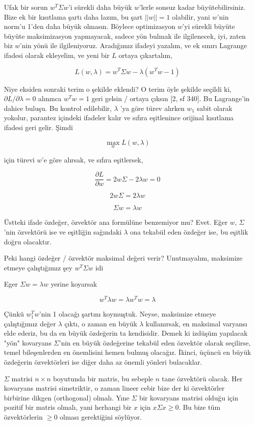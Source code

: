 \documentclass[12pt,fleqn]{article}\usepackage{../../common}
\begin{document}
Ufak bir sorun $w^T\Sigma w$'i sürekli daha büyük $w$'lerle sonsuz
kadar büyütebilirsiniz. Bize ek bir kısıtlama şartı daha lazım, bu şart
$||w|| = 1$ olabilir, yani $w$'nin norm'u 1'den daha büyük olmasın. Böylece
optimizasyon $w$'yi sürekli büyüte büyüte maksimizasyon yapmayacak, sadece
yön bulmak ile ilgilenecek, iyi, zaten biz $w$'nin yönü ile
ilgileniyoruz. Aradığımız ifadeyi yazalım, ve ek sınırı Lagrange ifadesi
olarak ekleyelim, ve yeni bir $L$ ortaya çıkartalım,

$$ L(w,\lambda) =  w^T \Sigma w  - \lambda(w^T w - 1) $$

Niye eksiden sonraki terim o şekilde eklendi? O terim öyle şekilde seçildi
ki, $\partial L / \partial \lambda = 0$ alınınca $w^Tw = 1$ geri gelsin /
ortaya çıksın [2, sf 340]. Bu Lagrange'in dahice buluşu. Bu kontrol
edilebilir, $\lambda$ 'ya göre türev alırken $w_1$ sabit olarak yokolur,
parantez içindeki ifadeler kalır ve sıfıra eşitlenince orijinal kısıtlama
ifadesi geri gelir. Şimdi

$$ \max\limits_{w} L(w,\lambda) $$

için türevi $w$'e göre alırsak, ve sıfıra eşitlersek,

$$ \frac{\partial L}{\partial w} = 2w \Sigma - 2 \lambda w = 0 $$

$$ 2w \Sigma = 2 \lambda w $$

$$ \Sigma w  = \lambda w $$

Üstteki ifade özdeğer, özvektör ana formülüne benzemiyor mu?
Evet. Eğer $w$, $\Sigma$'nin özvektörü ise ve eşitliğin sağındaki
$\lambda$ ona tekabül eden özdeğer ise, bu eşitlik doğru olacaktır.

Peki hangi özdeğer / özvektör maksimal değeri verir? Unutmayalım,
maksimize etmeye çalıştığımız şey $w^T \Sigma w$ idi

Eger $\Sigma w  = \lambda w$ yerine koyarsak

$$ w^T \lambda w =  \lambda w^T  w = \lambda $$

Çünkü $w_1^T w$'nin 1 olacağı şartını koymuştuk. Neyse, maksimize etmeye
çalıştığımız değer $\lambda$ çıktı, o zaman en büyük $\lambda$ kullanırsak,
en maksimal varyansı elde ederiz, bu da en büyük özdeğerin ta
kendisidir. Demek ki izdüşüm yapılacak "yön" kovaryans $\Sigma$'nin en
büyük özdeğerine tekabül eden özvektör olarak seçilirse, temel
bileşenlerden en önemlisini hemen bulmuş olacağız. İkinci, üçüncü en büyük
özdeğerin özvektörleri ise diğer daha az önemli yönleri bulacaklar. 

$\Sigma$ matrisi $n \times n$ boyutunda bir matris, bu sebeple $n$ tane
özvektörü olacak. Her kovaryans matrisi simetriktir, o zaman lineer cebir
bize der ki özvektörler birbirine dikgen (orthogonal) olmalı. Yıne $\Sigma$
bir kovaryans matrisi olduğu için pozitif bir matris olmalı, yani herhangi
bir $x$ için $x \Sigma x \ge 0$. Bu bize tüm özvektörlerin $\ge 0$ olması
gerektiğini söylüyor.
\end{document}
